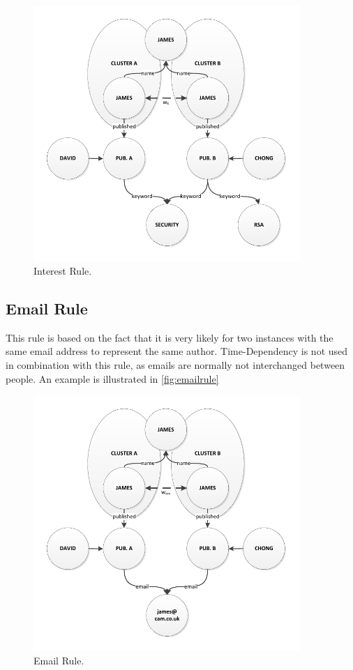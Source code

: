 \begin{figure}[h!]
	\centering
		\includegraphics[width=0.9\textwidth]{fig/interestrule}
	\caption{Interest Rule.}
	\label{fig:interestrule}
\end{figure}


\subsection{Email Rule}

This rule is based on the fact that it is very likely for two instances with the same email address to represent the same author. Time-Dependency is not used in combination with this rule, as emails are normally not interchanged between people. An example is illustrated in \autoref{fig:emailrule}

\begin{figure}[h!]
	\centering
		\includegraphics[width=0.9\textwidth]{fig/emailrule}
	\caption{Email Rule.}
	\label{fig:emailrule}
\end{figure}


